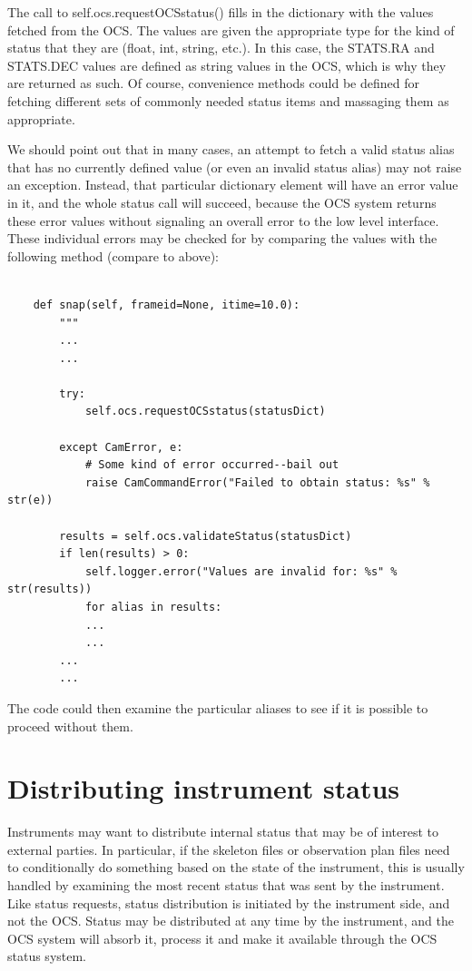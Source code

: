 \documentclass[11pt]{report}
\begin{document}
The call to self.ocs.requestOCSstatus() fills in the dictionary with the
values fetched from the OCS. The values are given the appropriate type
for the kind of status that they are (float, int, string, etc.). In this
case, the STATS.RA and STATS.DEC values are defined as string values in
the OCS, which is why they are returned as such. Of course, convenience
methods could be defined for fetching different sets of commonly needed
status items and massaging them as appropriate. 

We should point out that in many cases, an attempt to fetch a valid
status alias that has no currently defined value (or even an invalid
status alias) may not raise an exception. Instead, that particular
dictionary element will have an error value in it, and the whole status
call will succeed, because the OCS system returns these error values
without signaling an overall error to the low level interface. These
individual errors may be checked for by comparing the values with the
following method (compare to above): 
\begin{verbatim}

    def snap(self, frameid=None, itime=10.0):
        """
        ...
        ...

        try:
            self.ocs.requestOCSstatus(statusDict)

        except CamError, e:
            # Some kind of error occurred--bail out
            raise CamCommandError("Failed to obtain status: %s" % str(e))

        results = self.ocs.validateStatus(statusDict)
        if len(results) > 0:
            self.logger.error("Values are invalid for: %s" % str(results))
            for alias in results:
            ...
            ...
        ...
        ...

\end{verbatim}
The code could then examine the particular aliases to see if it is
possible to proceed without them. 

\section{Distributing instrument status}
Instruments may want to distribute internal status that may be of
interest to external parties. In particular, if the skeleton files or
observation plan files need to conditionally do something based on the
state of the instrument, this is usually handled by examining the most
recent status that was sent by the instrument. Like status requests,
status distribution is initiated by the instrument side, and not the
OCS. Status may be distributed at any time by the instrument, and the
OCS system will absorb it, process it and make it available through the
OCS status system. 
\end{document}
